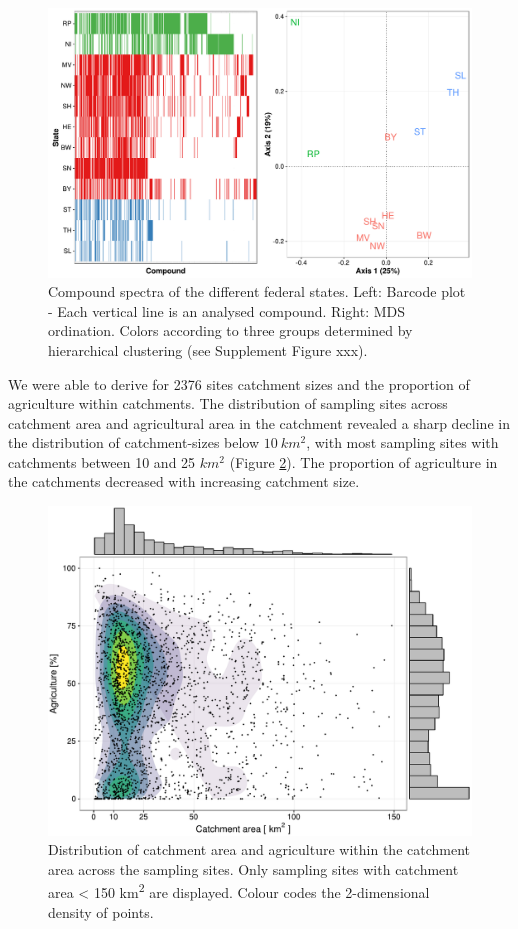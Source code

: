 \documentclass[journal=esthag,manuscript=article]{achemso}
\begin{document}
\begin{figure}
  \includegraphics[width=\textwidth]{fig/figvar.pdf}
  \caption{Compound spectra of the different federal states. Left: Barcode plot - Each vertical line is an analysed compound. Right: MDS ordination. 
  Colors according to three groups determined by hierarchical clustering (see Supplement Figure xxx).}
  \label{fig:figvar}
\end{figure}


We were able to derive for 2376 sites catchment sizes and the proportion of agriculture within catchments. 
The distribution of sampling sites across catchment area and agricultural area in the catchment revealed a sharp decline in the distribution of catchment-sizes below $10~km^2$, with most sampling sites with catchments between 10 and 25 $km^2$ (Figure \ref{fig:figezglu}).
The proportion of agriculture in the catchments decreased with increasing catchment size.

\begin{figure}
  \includegraphics[width=.8\textwidth]{fig/ezglu.pdf}
  \caption{Distribution of catchment area and agriculture within the catchment area across the sampling sites.
  Only sampling sites with catchment area < 150 km\textsuperscript{2} are displayed. 
  Colour codes the 2-dimensional density of points.
  }
  \label{fig:figezglu}
\end{figure}
\end{document}
